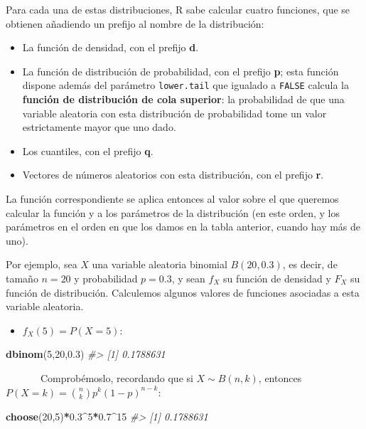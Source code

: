 \documentclass[
]{book}
\newenvironment{Shaded}{\begin{snugshade}}{\end{snugshade}}
\newcommand{\CommentTok}[1]{\textcolor[rgb]{0.56,0.35,0.01}{\textit{#1}}}
\newcommand{\DecValTok}[1]{\textcolor[rgb]{0.00,0.00,0.81}{#1}}
\newcommand{\FloatTok}[1]{\textcolor[rgb]{0.00,0.00,0.81}{#1}}
\newcommand{\KeywordTok}[1]{\textcolor[rgb]{0.13,0.29,0.53}{\textbf{#1}}}
\newcommand{\NormalTok}[1]{#1}
\newcommand{\OperatorTok}[1]{\textcolor[rgb]{0.81,0.36,0.00}{\textbf{#1}}}
\providecommand{\tightlist}{%
  \setlength{\itemsep}{0pt}\setlength{\parskip}{0pt}}
\theoremstyle{definition}
\theoremstyle{definition}
\theoremstyle{definition}
\theoremstyle{remark}
\begin{document}
Para cada una de estas distribuciones, R sabe calcular cuatro funciones, que se obtienen añadiendo un prefijo al nombre de la distribución:

\begin{itemize}
\item
  La función de densidad, con el prefijo \textbf{d}.
\item
  La función de distribución de probabilidad, con el prefijo \textbf{p}; esta función dispone además del parámetro \texttt{lower.tail} que igualado a \texttt{FALSE} calcula la \textbf{función de distribución de cola superior}: la probabilidad de que una variable aleatoria con esta distribución de probabilidad tome un valor estrictamente mayor que uno dado.
\item
  Los cuantiles, con el prefijo \textbf{q}.
\item
  Vectores de números aleatorios con esta distribución, con el prefijo \textbf{r}.
\end{itemize}

La función correspondiente se aplica entonces al valor sobre el que queremos calcular la función y a los parámetros de la distribución (en este orden, y los parámetros en el orden en que los damos en la tabla anterior, cuando hay más de uno).

Por ejemplo, sea \(X\) una variable aleatoria binomial \(B(20,0.3)\), es decir, de tamaño \(n=20\) y probabilidad \(p=0.3\), y sean \(f_X\) su función de densidad y \(F_X\) su función de distribución. Calculemos algunos valores de funciones asociadas a esta variable aleatoria.

\begin{itemize}
\tightlist
\item
  \(f_X(5)=P(X=5)\):
\end{itemize}

\begin{Shaded}
\begin{Highlighting}[]
\KeywordTok{dbinom}\NormalTok{(}\DecValTok{5}\NormalTok{,}\DecValTok{20}\NormalTok{,}\FloatTok{0.3}\NormalTok{)}
\CommentTok{\#\textgreater{} [1] 0.1788631}
\end{Highlighting}
\end{Shaded}

~~~~~~~Comprobémoslo, recordando que si \(X\sim B(n,k)\), entonces \(P(X=k)=\binom{n}{k}p^k(1-p)^{n-k}\):

\begin{Shaded}
\begin{Highlighting}[]
\KeywordTok{choose}\NormalTok{(}\DecValTok{20}\NormalTok{,}\DecValTok{5}\NormalTok{)}\OperatorTok{*}\FloatTok{0.3}\OperatorTok{\^{}}\DecValTok{5}\OperatorTok{*}\FloatTok{0.7}\OperatorTok{\^{}}\DecValTok{15}
\CommentTok{\#\textgreater{} [1] 0.1788631}
\end{Highlighting}
\end{Shaded}
\end{document}
